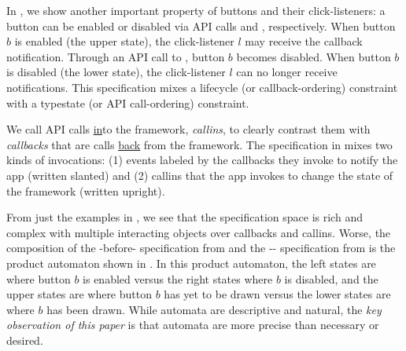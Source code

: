 \documentclass[10pt,reprint,nocopyrightspace,numbers]{sigplanconf}
\begin{document}
In , we show another important property of buttons and their click-listeners: a button can be enabled or disabled via API calls  and , respectively.
When button $b$ is enabled (the upper state), the click-listener $l$ may receive the  callback notification. Through an API call to , button $b$ becomes disabled. When button $b$ is disabled (the lower state), the click-listener $l$ can no longer receive  notifications.
This specification mixes a lifecycle (or callback-ordering) constraint with a typestate (or API call-ordering) constraint.

We call API calls \underline{in}to the framework, \emph{callins}, to clearly contrast them with \emph{callbacks} that are calls \underline{back} from the framework.
The specification in  mixes two kinds of invocations: (1) events labeled by the callbacks they invoke to notify the app (written {\lstbasicstyle\cbstyle slanted}) and (2) callins that the app invokes to change the state of the framework (written {\lstbasicstyle\cistyle upright}).

From just the examples in , we see that the specification space is rich and complex with multiple interacting objects over callbacks and callins.
Worse, the composition of the -before- specification from  and the -- specification from  is the product automaton shown in .
In this product automaton, the left states are where button $b$ is enabled versus the right states where $b$ is disabled, and the upper states are where button $b$ has yet to be drawn versus the lower states are where $b$ has been drawn.
While automata are descriptive and natural, the \emph{key observation of this paper} is that automata are more precise than necessary or desired.
\end{document}
